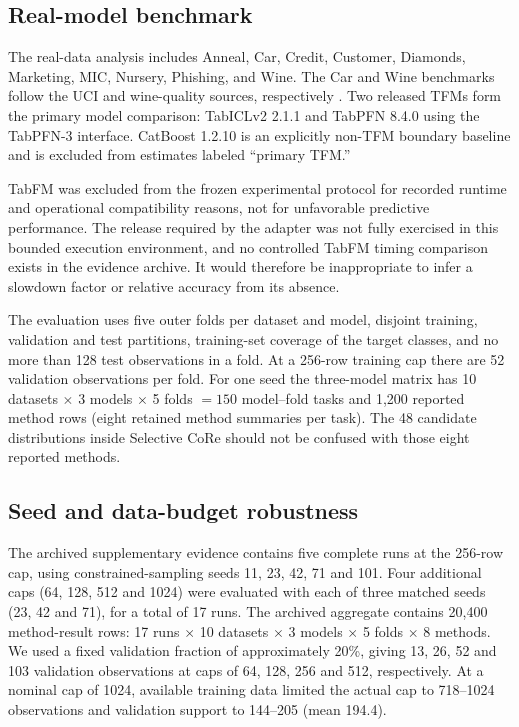 \documentclass[a4paper,fleqn]{cas-sc}
\begin{document}
\subsection{Real-model benchmark}
The real-data analysis includes Anneal, Car, Credit, Customer, Diamonds, Marketing, MIC, Nursery, Phishing, and Wine. The Car and Wine benchmarks follow the UCI and wine-quality sources, respectively \citep{bohanec1988car,cortez2009wine}. Two released TFMs form the primary model comparison: TabICLv2 2.1.1 and TabPFN 8.4.0 using the TabPFN-3 interface. CatBoost 1.2.10 is an explicitly non-TFM boundary baseline and is excluded from estimates labeled ``primary TFM.''

TabFM was excluded from the frozen experimental protocol for recorded runtime and operational compatibility reasons, not for unfavorable predictive performance. The release required by the adapter was not fully exercised in this bounded execution environment, and no controlled TabFM timing comparison exists in the evidence archive. It would therefore be inappropriate to infer a slowdown factor or relative accuracy from its absence.

The evaluation uses five outer folds per dataset and model, disjoint training, validation and test partitions, training-set coverage of the target classes, and no more than 128 test observations in a fold. At a 256-row training cap there are 52 validation observations per fold. For one seed the three-model matrix has 10 datasets $\times$ 3 models $\times$ 5 folds $=150$ model--fold tasks and 1,200 reported method rows (eight retained method summaries per task). The 48 candidate distributions inside Selective CoRe should not be confused with those eight reported methods.

\subsection{Seed and data-budget robustness}
The archived supplementary evidence contains five complete runs at the 256-row cap, using constrained-sampling seeds 11, 23, 42, 71 and 101. Four additional caps (64, 128, 512 and 1024) were evaluated with each of three matched seeds (23, 42 and 71), for a total of 17 runs. The archived aggregate contains 20,400 method-result rows: 17 runs $\times$ 10 datasets $\times$ 3 models $\times$ 5 folds $\times$ 8 methods. We used a fixed validation fraction of approximately 20\%, giving 13, 26, 52 and 103 validation observations at caps of 64, 128, 256 and 512, respectively. At a nominal cap of 1024, available training data limited the actual cap to 718--1024 observations and validation support to 144--205 (mean 194.4).
\end{document}

